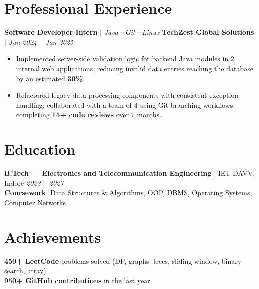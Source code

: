 \documentclass[a4paper,10pt]{article}
\begin{document}
\section*{Professional Experience}

\textbf{Software Developer Intern} $|$ \textit{Java $\cdot$ Git $\cdot$ Linux} \hfill \textbf{TechZest Global Solutions} $|$ \textit{Jun 2024 -- Jan 2025}
\begin{itemize}
  \item Implemented server-side validation logic for backend Java modules in 2 internal web applications, reducing invalid data entries reaching the database by an estimated \textbf{30\%}.
  \item Refactored legacy data-processing components with consistent exception handling; collaborated with a team of 4 using Git branching workflows, completing \textbf{15+ code reviews} over 7 months.
\end{itemize}

\section*{Education}
\textbf{B.Tech --- Electronics and Telecommunication Engineering} $|$ IET DAVV, Indore \hfill \textit{2023 -- 2027} \\
\textbf{Coursework}: Data Structures \& Algorithms, OOP, DBMS, Operating Systems, Computer Networks

\section*{Achievements}
\textbf{450+ LeetCode} problems solved (DP, graphs, trees, sliding window, binary search, array) \\
\textbf{950+ GitHub contributions} in the last year
\end{document}
